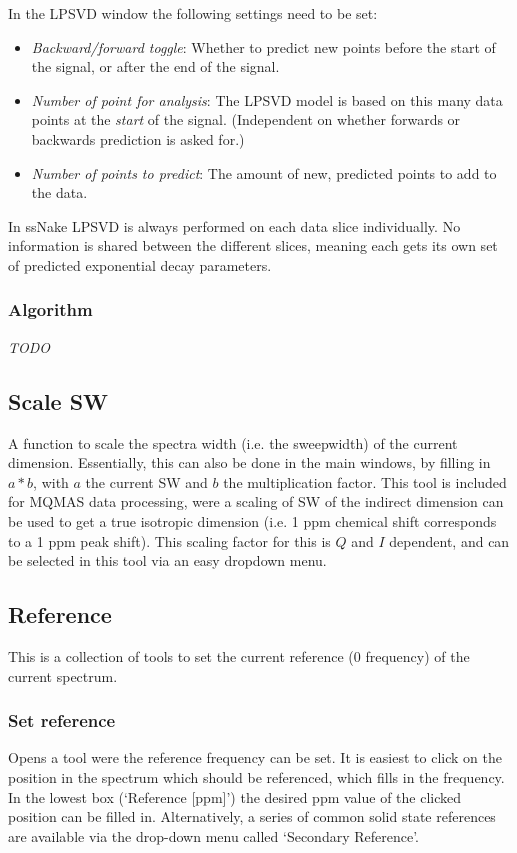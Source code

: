 \documentclass[11pt,a4paper]{article}
\begin{document}
In the LPSVD window the following settings need to be set:
\begin{itemize}
\item \textit{Backward/forward toggle}: Whether to predict new points before the start of the signal, or after the end of the signal.
\item \textit{Number of point for analysis}: The LPSVD model is based on this many data points at the \textit{start} of the signal. (Independent on whether forwards or backwards prediction is asked for.)
\item \textit{Number of points to predict}: The amount of new, predicted points to add to the data.
\end{itemize}

In ssNake LPSVD is always performed on each data slice individually. No information is shared between the different slices, meaning each gets its own set of predicted exponential decay parameters.

\subsubsection*{Algorithm}
\textit{TODO}




\subsection{Scale SW}
A function to scale the spectra width (i.e. the sweepwidth) of the current dimension. Essentially,
this can also be done in the main windows, by filling in $a * b$, with $a$ the current SW and $b$
the multiplication factor. This tool is included for MQMAS data processing, were a scaling of SW of the
indirect dimension can be used to get a true isotropic dimension (i.e. 1 ppm chemical shift
corresponds to a 1 ppm peak shift). This scaling factor for this is $Q$ and $I$ dependent, and can be selected in
this tool via an easy dropdown menu.

\subsection{Reference}
This is a collection of tools to set the current reference (0 frequency) of the current spectrum.

\subsubsection{Set reference}
Opens a tool were the reference frequency can be set. It is easiest to click on the position in the spectrum
which should be referenced, which fills in the frequency. In the lowest box (`Reference [ppm]') the desired
ppm value of the clicked position can be filled in. Alternatively, a series of common solid state references
are available via the drop-down menu called `Secondary Reference'.
\end{document}
